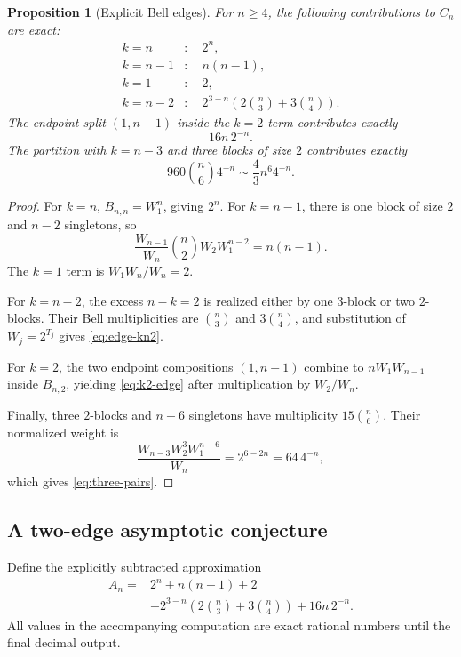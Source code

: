 \documentclass[11pt,a4paper]{article}
\newtheorem{proposition}[theorem]{Proposition}
\theoremstyle{definition}
\theoremstyle{remark}
\begin{document}
\begin{proposition}[Explicit Bell edges]
\label{prop:bell-edges}
For $n\ge4$, the following contributions to $C_n$ are exact:
\begin{align}
 k=n &: \quad 2^n,
 \label{eq:edge-kn}\\
 k=n-1 &: \quad n(n-1),
 \label{eq:edge-kn1}\\
 k=1 &: \quad 2,
 \label{eq:edge-k1}\\
 k=n-2 &: \quad
 2^{3-n}\left(2\binom n3+3\binom n4\right).
 \label{eq:edge-kn2}
\end{align}
The endpoint split $(1,n-1)$ inside the $k=2$ term contributes exactly
\begin{equation}
  16n\,2^{-n}.
  \label{eq:k2-edge}
\end{equation}
The partition with $k=n-3$ and three blocks of size $2$ contributes exactly
\begin{equation}
  960\binom n6 4^{-n}
  \sim\frac43n^6 4^{-n}.
  \label{eq:three-pairs}
\end{equation}
\end{proposition}

\begin{proof}
For $k=n$, $B_{n,n}=W_1^n$, giving $2^n$.  For $k=n-1$, there is one block of
size $2$ and $n-2$ singletons, so
\[
 \frac{W_{n-1}}{W_n}\binom n2W_2W_1^{n-2}=n(n-1).
\]
The $k=1$ term is $W_1W_n/W_n=2$.

For $k=n-2$, the excess $n-k=2$ is realized either by one $3$-block or two
$2$-blocks.  Their Bell multiplicities are $\binom n3$ and $3\binom n4$, and
substitution of $W_j=2^{T_j}$ gives \eqref{eq:edge-kn2}.

For $k=2$, the two endpoint compositions $(1,n-1)$ combine to
$nW_1W_{n-1}$ inside $B_{n,2}$, yielding \eqref{eq:k2-edge} after multiplication by
$W_2/W_n$.

Finally, three $2$-blocks and $n-6$ singletons have multiplicity
$15\binom n6$.  Their normalized weight is
\[
 \frac{W_{n-3}W_2^3W_1^{n-6}}{W_n}=2^{6-2n}=64\,4^{-n},
\]
which gives \eqref{eq:three-pairs}.
\end{proof}

\subsection{A two-edge asymptotic conjecture}

Define the explicitly subtracted approximation
\begin{equation}
 \begin{split}
 A_n={}&2^n+n(n-1)+2\\
 &+2^{3-n}\left(2\binom n3+3\binom n4\right)
 +16n\,2^{-n}.
 \end{split}
 \label{eq:An}
\end{equation}
All values in the accompanying computation are exact rational numbers until the
final decimal output.
\end{document}
